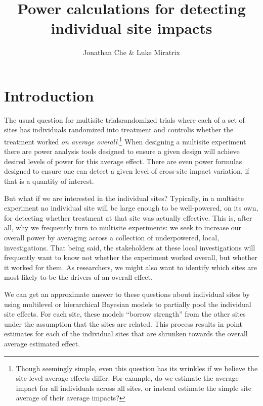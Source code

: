 \documentclass[]{article}
\title{Power calculations for detecting \\ individual site impacts}
\author{Jonathan Che \& Luke Miratrix}
\begin{document}
\maketitle



\section{Introduction}

The usual question for multisite trials\textemdash randomized trials where each of a set of sites has individuals randomized into treatment and control\textemdash is whether the treatment worked \emph{on average overall}.\footnote{Though seemingly simple, even this question has its wrinkles if we believe the site-level average effects differ.
For example, do we estimate the average impact for all individuals across all sites, or instead estimate the simple site average of their average impacts?}
When designing a multisite experiment there are power analysis tools designed to ensure a given design will achieve desired levels of power for this average effect.
There are even power formulas designed to ensure one can detect a given level of cross-site impact variation, if that is a quantity of interest.

But what if we are interested in the individual sites?
Typically, in a multisite experiment no individual site will be large enough to be well-powered, on its own, for detecting whether treatment at that site was actually effective.
This is, after all, why we frequently turn to multisite experiments: we seek to increase our overall power by averaging across a collection of underpowered, local, investigations.
That being said, the stakeholders at these local investigations will frequently want to know not whether the experiment worked overall, but whether it worked for them.
As researchers, we might also want to identify which sites are most likely to be the drivers of an overall effect.

We can get an approximate answer to these questions about individual sites by using multilevel or hierarchical Bayesian models to partially pool the individual site effects.
For each site, these models ``borrow strength'' from the other sites under the assumption that the sites are related.
This process results in point estimates for each of the individual sites that are shrunken towards the overall average estimated effect.
\end{document}
